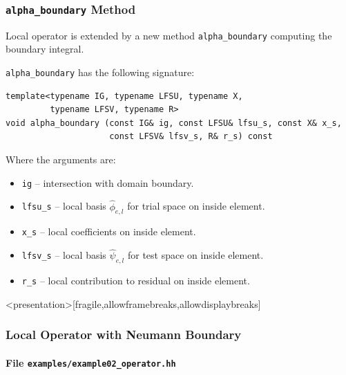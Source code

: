 \begin{frame}[fragile]
\frametitle{\lstinline{alpha_boundary} Method}
Local operator is extended by a new method \lstinline{alpha_boundary}
computing the boundary integral.

\lstinline{alpha_boundary} has the following signature: 
\begin{lstlisting}[basicstyle=\scriptsize]
template<typename IG, typename LFSU, typename X, 
         typename LFSV, typename R>
void alpha_boundary (const IG& ig, const LFSU& lfsu_s, const X& x_s, 
                     const LFSV& lfsv_s, R& r_s) const
\end{lstlisting}
Where the arguments are:
\begin{itemize}
\item \lstinline{ig} -- intersection with domain boundary.
\item \lstinline{lfsu_s} -- local basis $\hat\phi_{e,l}$ for trial space on inside element.
\item \lstinline{x_s} -- local coefficients on inside element.
\item \lstinline{lfsv_s} -- local basis $\hat\psi_{e,l}$ for test space on inside element. 
\item \lstinline{r_s} -- local contribution to residual on inside element.
\end{itemize}
\end{frame}


\begin{frame}<presentation>[fragile,allowframebreaks,allowdisplaybreaks]
\frametitle<presentation>{Local Operator with Neumann Boundary}
\framesubtitle<presentation>{File \texttt{examples/example02\_operator.hh}}

\end{frame}

